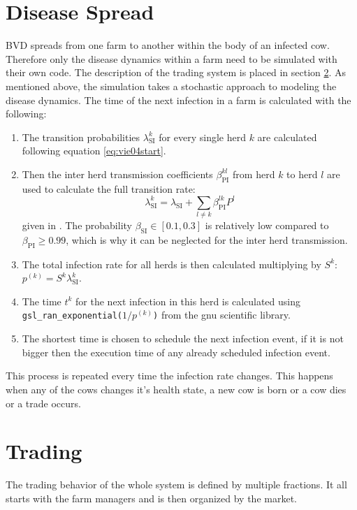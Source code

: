 \section{Disease Spread}
BVD spreads from one farm to another within the body of an infected cow. Therefore only the disease dynamics within a farm need to be simulated with their own code. The description of the trading system is placed in section \ref{chap:tradeDesc}. As mentioned above, the simulation takes a stochastic approach to modeling the disease dynamics. The time of the next infection in a farm is calculated with the following: \\
\begin{enumerate}
\item The transition probabilities $\lambda_\text{SI}^k$ for every single herd $k$ are calculated following equation \ref{eq:vie04start}.
\item Then the inter herd transmission coefficients $\beta^{kl}_\text{PI}$ from herd $k$ to herd $l$ are used to calculate the full transition rate:
\begin{equation}
\lambda_\text{SI}^k = \lambda_\text{SI} + \sum_{l \neq k} \beta^{lk}_\text{PI} P^l
\end{equation}
given in \citep{VIE04}. The probability $\beta_\text{SI} \in [0.1,0.3] $ is relatively low compared to $\beta_\text{PI} \geq 0.99$, which is why it can be neglected for the inter herd transmission.
\item The total infection rate for all herds is then calculated multiplying by $S^k$: $p^{(k)} = S^k \lambda_\text{SI}^k $.
\item The time $t^k$ for the next infection in this herd is calculated using\\ {\tt gsl\_ran\_exponential($1/p^{(k)}$)} from the gnu scientific library.
\item The shortest time is chosen to schedule the next infection event, if it is not bigger then the execution time of any already scheduled infection event.
\end{enumerate}
This process is repeated every time the infection rate changes. This happens when any of the cows changes it's health state, a new cow is born or a cow dies or a trade occurs. 
\section{Trading}\label{chap:tradeDesc}
The trading behavior of the whole system is defined by multiple fractions. It all starts with the farm managers and is then organized by the market.
